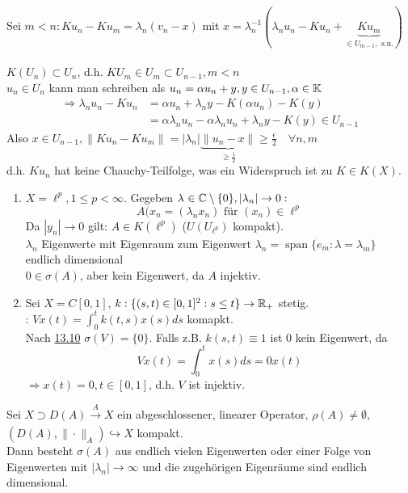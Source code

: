 \begin{beweis}
	Sei $m < n: K u_{n} - K u_{m} = \lambda_{n} (v_{n} - x)$ mit $x = \lambda_{n}^{-1} (\lambda_{n} u_{n} - K u_{n} + \underbrace{K u_{m}}_{\in U_{m-1}, \text{ s.u.}})$ \\ \\
	$K(U_{n}) \subset U_{n}$, d.h. $K U_{m} \in U_{m} \subset U_{n - 1}, m < n$ \\
	$u_{n} \in U_{n}$ kann man schreiben als $u_{n} = \alpha u_{n} + y, y \in U_{n - 1}, \alpha \in \mathbb{K}$
	\begin{align*}
		\Rightarrow \lambda_{n} u_{n} - K u_{n} & = \alpha u_{n} + \lambda_{n} y - K(\alpha u_{n}) - K(y) \\
			& = \alpha \lambda_{n} u_{n} - \alpha \lambda_{n} u_{n} + \lambda_{n} y - K(y) \in U_{n - 1}
	\end{align*}
	Also $x \in U_{n - 1}, \| K u_{n} - K u_{m}\| = |\lambda_{n}| \underbrace{\| u_{n} - x \|}_{\geq \frac{1}{2}} \geq \frac{\epsilon}{2} \quad \forall n, m$ \\
	d.h. $K u_{n}$ hat keine Chauchy-Teilfolge, was ein Widerspruch ist zu $K \in K(X)$.
\end{beweis}


\begin{beispiel}
	\begin{enumerate}[label=\alph*\upshape)]
		\item $X = \ell^{p}, 1 \leq p < \infty$. Gegeben $\lambda_{} \in \mathbb{C} \setminus \{ 0 \}, | \lambda_{n} | \rightarrow 0:$
			\[ A(x_{n} = (\lambda_{n} x_{n}) \text{ für } (x_{n}) \in \ell^{p} \]
			Da $| y_{n} | \rightarrow 0$ gilt: $A \in K(\ell^{p})$ ($U(U_{\ell^{p}})$ kompakt). \\
			$\lambda_{n}$ Eigenwerte mit Eigenraum zum Eigenwert $\lambda_{n} = \operatorname{span}\{ e_{m}: \lambda = \lambda_{m} \}$ endlich dimensional \\
			$0 \in \sigma(A)$, aber kein Eigenwert, da $A$ injektiv.
		\item Sei $X = C[0, 1]$, $k: \{ (s, t) \in [0, 1]^{2}: s \leq t \} \rightarrow \mathbb{R}_{+}$ stetig. \\
			: $V x(t) = \int_{0}^{t} k(t, s) x(s) ds$ komapkt. \\
			Nach \hyperref[]{13.10} $\sigma(V) = \{ 0 \}$. %
			Falls z.B. $k(s, t) \equiv 1$ ist $0$ kein Eigenwert, da 
			\[ V x(t) = \int_{0}^{t} x(s) ds = 0 x(t) \]
			$\Rightarrow x(t) = 0, t \in [0, 1]$, d.h. $V$ ist injektiv.
	\end{enumerate}	
\end{beispiel}


\begin{satz}
	Sei $X \supset D(A) \xrightarrow[]{A} X$ ein abgeschlossener, linearer Operator, $\rho(A) \neq \emptyset$, $(D(A), \| \cdot \|_{A}) \hookrightarrow X$ kompakt. \\
	Dann besteht $\sigma(A)$ aus endlich vielen Eigenwerten oder einer Folge von Eigenwerten mit $|\lambda_{n}| \rightarrow \infty$ und die zugehörigen Eigenräume sind endlich dimensional.
\end{satz}




\newpage